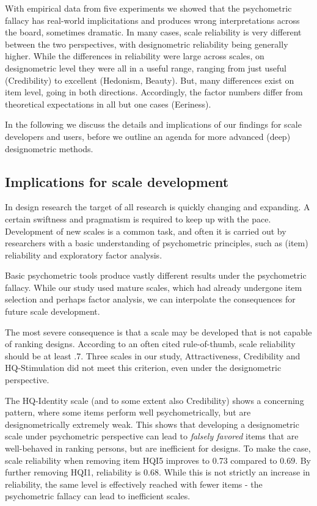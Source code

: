 \documentclass[
  authoryear,
  review]{elsarticle}
\begin{document}
With empirical data from five experiments we showed that the
psychometric fallacy has real-world implicitations and produces wrong
interpretations across the board, sometimes dramatic. In many cases,
scale reliability is very different between the two perspectives, with
designometric reliability being generally higher. While the differences
in reliability were large across scales, on designometric level they
were all in a useful range, ranging from just useful (Credibility) to
excellent (Hedonism, Beauty). But, many differences exist on item level,
going in both directions. Accordingly, the factor numbers differ from
theoretical expectations in all but one cases (Eeriness).

In the following we discuss the details and implications of our findings
for scale developers and users, before we outline an agenda for more
advanced (deep) designometric methods.

\subsection{Implications for scale
development}\label{implications-for-scale-development}

In design research the target of all research is quickly changing and
expanding. A certain swiftness and pragmatism is required to keep up
with the pace. Development of new scales is a common task, and often it
is carried out by researchers with a basic understanding of psychometric
principles, such as (item) reliability and exploratory factor analysis.

Basic psychometric tools produce vastly different results under the
psychometric fallacy. While our study used mature scales, which had
already undergone item selection and perhaps factor analysis, we can
interpolate the consequences for future scale development.

The most severe consequence is that a scale may be developed that is not
capable of ranking designs. According to an often cited rule-of-thumb,
scale reliability should be at least .7. Three scales in our study,
Attractiveness, Credibility and HQ-Stimulation did not meet this
criterion, even under the designometric perspective.

The HQ-Identity scale (and to some extent also Credibility) shows a
concerning pattern, where some items perform well psychometrically, but
are designometrically extremely weak. This shows that developing a
designometric scale under psychometric perspective can lead to
\emph{falsely favored} items that are well-behaved in ranking persons,
but are inefficient for designs. To make the case, scale reliability
when removing item HQI5 improves to \(0.73\) compared to \(0.69\). By
further removing HQI1, reliability is \(0.68\). While this is not
strictly an increase in reliability, the same level is effectively
reached with fewer items - the psychometric fallacy can lead to
inefficient scales.
\end{document}
